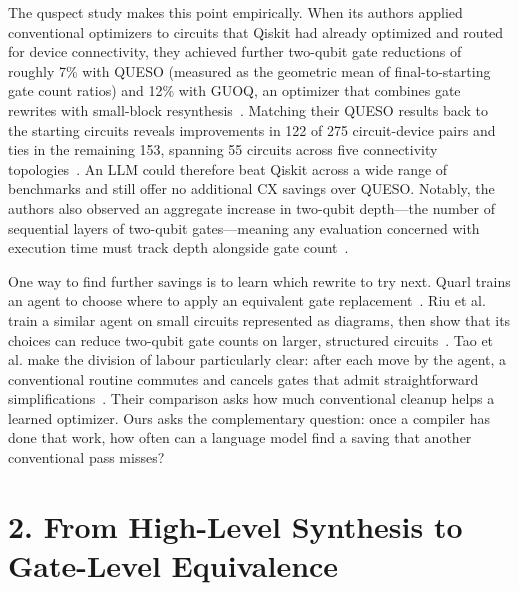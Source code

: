 \documentclass[12pt]{article}
\begin{document}
The quspect study makes this point empirically. When its authors applied conventional optimizers to
circuits that Qiskit had already optimized and routed for device connectivity, they achieved further
two-qubit gate reductions of roughly 7\% with QUESO (measured as the geometric mean of final-to-starting
gate count ratios) and 12\% with GUOQ, an optimizer that combines gate rewrites with small-block
resynthesis~\cite{quspect}. Matching their QUESO results back to the starting circuits reveals
improvements in 122 of 275 circuit-device pairs and ties in the remaining 153, spanning 55 circuits
across five connectivity topologies~\cite{quspect}. An LLM could therefore beat Qiskit across a wide
range of benchmarks and still offer no additional CX savings over QUESO. Notably, the authors also
observed an aggregate increase in two-qubit depth—the number of sequential layers of two-qubit
gates—meaning any evaluation concerned with execution time must track depth alongside gate
count~\cite{quspect}.

One way to find further savings is to learn which rewrite to try next. Quarl trains an agent to choose
where to apply an equivalent gate replacement~\cite{quarl}. Riu et al. train a similar agent on small
circuits represented as diagrams, then show that its choices can reduce two-qubit gate counts on
larger, structured circuits~\cite{riu}. Tao et al. make the division of labour particularly clear:
after each move by the agent, a conventional routine commutes and cancels gates that admit
straightforward simplifications~\cite{tao}. Their comparison asks how much conventional cleanup helps a
learned optimizer. Ours asks the complementary question: once a compiler has done that work, how often
can a language model find a saving that another conventional pass misses?

\section{2. From High-Level Synthesis to Gate-Level Equivalence}
\end{document}
